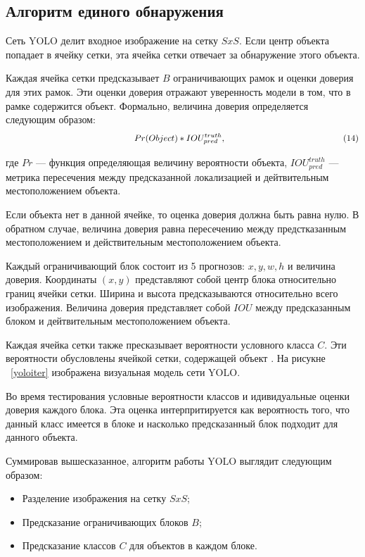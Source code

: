 \documentclass[a4paper,english,russian]{G2-105}
\begin{document}
\subsection{Алгоритм единого обнаружения}
\par Сеть YOLO делит входное изображение на сетку $SxS$. Если центр объекта попадает в ячейку сетки, эта ячейка сетки отвечает за обнаружение этого объекта.
\par Каждая ячейка сетки предсказывает $B$ ограничивающих рамок и оценки доверия для этих рамок. Эти оценки доверия отражают уверенность модели в том, что в рамке содержится объект. Формально, величина доверия определяется следующим образом:
\[
\ \hspace*{50mm} Pr(Object)*IOU_{pred}^{truth},  \ \hspace*{46mm} (14)
\]
\par где $Pr$ --- функция определяющая величину вероятности объекта, $IOU_{pred}^{truth}$ --- метрика пересечения между предсказанной локализацией и дейтвительным местоположением объекта.
\par Если объекта нет в данной ячейке, то оценка доверия должна быть равна нулю. В обратном случае, величина доверия равна пересечению между предстказанным местоположением и действительным местоположением объекта.
\par Каждый ограничивающий блок состоит из 5 прогнозов: $x, y, w, h$ и величина доверия. Координаты $(x, y)$ представляют собой центр блока относительно границ ячейки сетки. Ширина и высота предсказываются относительно всего изображения. Величина доверия представляет собой $IOU$ между предсказанным блоком и дейтвительным местоположением объекта.
\par Каждая ячейка сетки также пресказывает вероятности условного класса $C$. Эти вероятности обусловлены ячейкой сетки, содержащей объект \cite{18}. На рисукне ~\ref{yoloiter} изображена визуальная модель сети YOLO.
\par Во время тестирования условные вероятности классов и идивидуальные оценки доверия каждого блока. Эта оценка интерпритируется как вероятность того, что данный класс имеется в блоке и насколько предсказанный блок подходит для данного объекта. 
\par Суммировав вышесказанное, алгоритм работы YOLO выглядит следующим образом:
\begin{itemize}
\item Разделение изображения на сетку $SxS$;
\item Предсказание ограничивающих блоков $B$;
\item Предсказание классов $C$ для объектов в каждом блоке.
\end{itemize}
\end{document}
